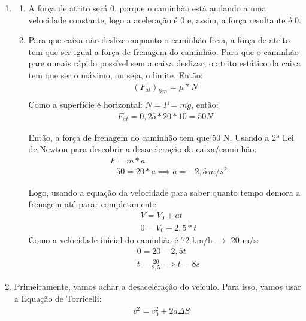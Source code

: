 \documentclass[12pt,letterpaper,fleqn]{article}
\begin{document}
\begin{itemize}
\begin{enumerate}
    \item \begin{enumerate}
        \item A força de atrito será 0, porque o caminhão está andando a uma velocidade constante, logo a aceleração é 0 e, assim, a força resultante é 0.
        
        \item Para que caixa não deslize enquanto o caminhão freia, a força de atrito tem que ser igual a força de frenagem do caminhão. Para que o caminhão pare o mais rápido possível sem a caixa deslizar, o atrito estático da caixa tem que ser o máximo, ou seja, o limite. Então:
        \begin{align*}
            (F_{at})_{lim} = \mu*N \\
        \end{align*}
        Como a superfície é horizontal: $N = P = mg$, então:
        \begin{align*}
            F_{at} = 0,25*20*10 = 50 N
        \end{align*}
        
        Então, a força de frenagem do caminhão tem que 50 N. Usando a 2ª Lei de Newton para descobrir a desaceleração da caixa/caminhão:
        \begin{align*}
            &F = m*a\\
            &-50 = 20*a \implies a = -2,5 \, m/s^2
        \end{align*}
        
        Logo, usando a equação da velocidade para saber quanto tempo demora a frenagem até parar completamente:
        \begin{align*}
            &V = V_0 + at\\
            &0 = V_0 -2,5*t
        \end{align*}
        Como a velocidade inicial do caminhão é 72 km/h $\rightarrow$ 20 m/s:
        \begin{align*}
            &0=20-2,5t \\
            &t = \frac{20}{2,5} \implies\boxed{t = 8s}
        \end{align*}
    \end{enumerate}
    \item Primeiramente, vamos achar a desaceleração do veículo. Para isso, vamos usar a Equação de Torricelli:
    \begin{align*}
        &v^2 = v_0^2 + 2a\Delta S\\
    \end{align*}
    

\end{enumerate}
\end{itemize}
\end{document}
